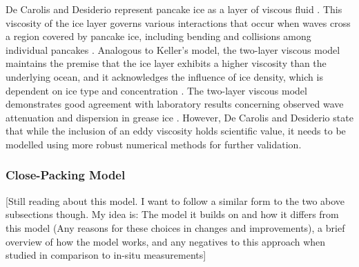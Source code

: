 
De Carolis and Desiderio \cite{DeCarolis2002} represent pancake ice as a layer of viscous fluid \cite{DeCarolis2002,Doble2015}. This viscosity of the ice layer governs various interactions that occur when waves cross a region covered by pancake ice, including bending and collisions among individual pancakes \cite{Doble2015}. Analogous to Keller's model, the two-layer viscous model maintains the premise that the ice layer exhibits a higher viscosity than the underlying ocean, and it acknowledges the influence of ice density, which is dependent on ice type and concentration \cite{DeCarolis2002,Doble2015}. The two-layer viscous model demonstrates good agreement with laboratory results concerning observed wave attenuation and dispersion in grease ice \cite{DeCarolis2002}. However, De Carolis and Desiderio state that while the inclusion of an eddy viscosity holds scientific value, it needs to be modelled using more robust numerical methods for further validation.

\subsubsection{Close-Packing Model} \label{subsubsec:litReview.sarCharac.seaIceWaveModelling.CP}

[Still reading about this model. I want to follow a similar form to the two above subsections though. My idea is: The model it builds on and how it differs from this model (Any reasons for these choices in changes and improvements), a brief overview of how the model works, and any negatives to this approach when studied in comparison to in-situ measurements]

